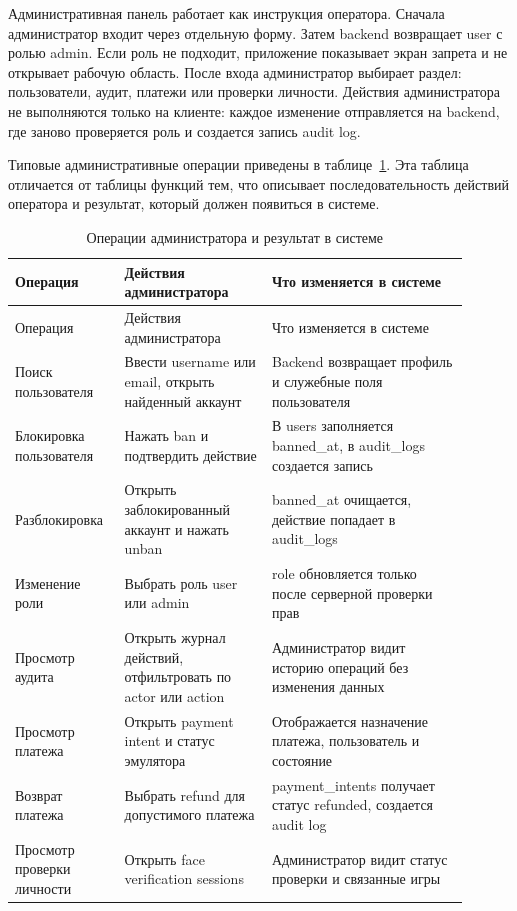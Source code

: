 
Административная панель работает как инструкция оператора. Сначала администратор входит через отдельную форму. Затем backend возвращает user с ролью admin. Если роль не подходит, приложение показывает экран запрета и не открывает рабочую область. После входа администратор выбирает раздел: пользователи, аудит, платежи или проверки личности. Действия администратора не выполняются только на клиенте: каждое изменение отправляется на backend, где заново проверяется роль и создается запись audit log.

Типовые административные операции приведены в таблице~\ref{tab:admin-operator-actions}. Эта таблица отличается от таблицы функций тем, что описывает последовательность действий оператора и результат, который должен появиться в системе.

\noindent\scriptsize
\setlength{\tabcolsep}{3pt}
\renewcommand{\arraystretch}{1.16}
\begin{longtable}{|>{\RaggedRight\arraybackslash}p{0.20\linewidth}|>{\RaggedRight\arraybackslash}p{0.30\linewidth}|>{\RaggedRight\arraybackslash}p{0.40\linewidth}|}
\caption{Операции администратора и результат в системе}\label{tab:admin-operator-actions}\\
\hline
Операция & Действия администратора & Что изменяется в системе\\ \hline
\endfirsthead
\hline
Операция & Действия администратора & Что изменяется в системе\\ \hline
\endhead
Поиск пользователя & Ввести username или email, открыть найденный аккаунт & Backend возвращает профиль и служебные поля пользователя\\ \hline
Блокировка пользователя & Нажать ban и подтвердить действие & В users заполняется banned_at, в audit_logs создается запись\\ \hline
Разблокировка & Открыть заблокированный аккаунт и нажать unban & banned_at очищается, действие попадает в audit_logs\\ \hline
Изменение роли & Выбрать роль user или admin & role обновляется только после серверной проверки прав\\ \hline
Просмотр аудита & Открыть журнал действий, отфильтровать по actor или action & Администратор видит историю операций без изменения данных\\ \hline
Просмотр платежа & Открыть payment intent и статус эмулятора & Отображается назначение платежа, пользователь и состояние\\ \hline
Возврат платежа & Выбрать refund для допустимого платежа & payment_intents получает статус refunded, создается audit log\\ \hline
Просмотр проверки личности & Открыть face verification sessions & Администратор видит статус проверки и связанные игры\\ \hline
\end{longtable}
\normalsize

